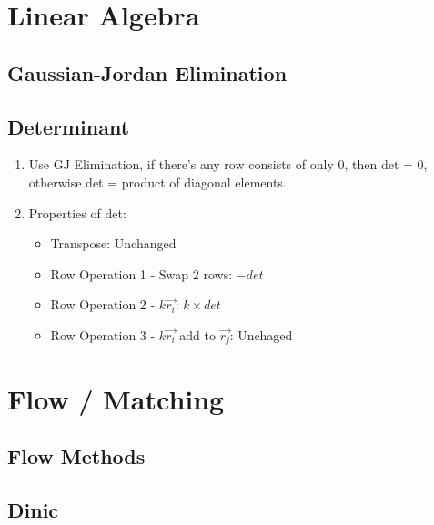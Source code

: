 \documentclass[a4paper,10pt,twocolumn,oneside]{article}
\begin{document}
% 


\section{Linear Algebra}

\subsection{Gaussian-Jordan Elimination}


\subsection{Determinant}
{\normalsize
\noindent
\begin{enumerate}
\item Use GJ Elimination, if there's any row consists of only 0, then det = 0, otherwise det = product of diagonal elements.
\item Properties of det:
\begin{itemize}
    \item Transpose: Unchanged
    \item Row Operation 1 - Swap 2 rows: $-det$
    \item Row Operation 2 - $k \overrightarrow{r_i}$: $k \times det$
    \item Row Operation 3 - $k \overrightarrow{r_i}$ add to  $\overrightarrow{r_j}$: Unchaged
\end{itemize}
\end{enumerate}
}

\section{Flow / Matching}

\subsection{Flow Methods}


\subsection{Dinic}

\end{document}
